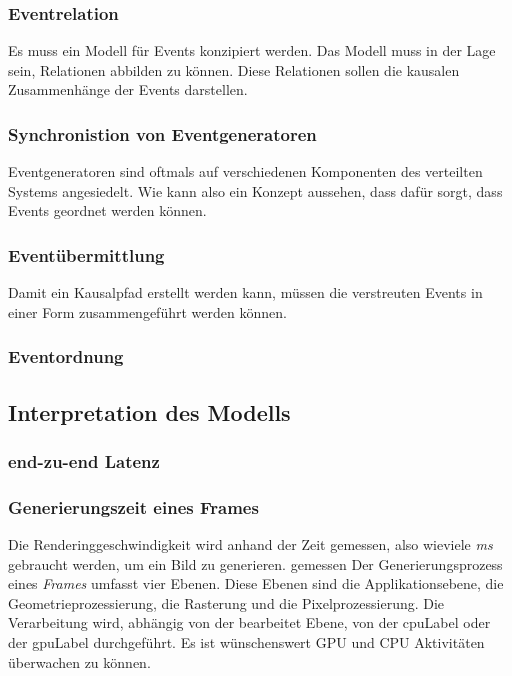\subsubsection{Eventrelation}
\label{subsection:Eventkorrelation}
Es muss ein Modell für Events konzipiert werden. Das Modell muss in der Lage sein, Relationen abbilden zu können. Diese Relationen sollen die kausalen Zusammenhänge der Events darstellen. 

\subsubsection{Synchronistion von Eventgeneratoren}
\label{subsection:Synchronistion von Eventgeneratoren}
Eventgeneratoren sind oftmals auf verschiedenen Komponenten des verteilten Systems angesiedelt. Wie kann also ein Konzept aussehen, dass dafür sorgt, dass Events geordnet werden können.

\subsubsection{Eventübermittlung}
\label{section:Eventübermittlung}
Damit ein Kausalpfad erstellt werden kann, müssen die verstreuten Events in einer Form zusammengeführt werden können.

\subsubsection{Eventordnung}

\subsection{Interpretation des Modells}

\subsubsection{end-zu-end Latenz}

\subsubsection{Generierungszeit eines Frames}
Die Renderinggeschwindigkeit wird anhand der Zeit gemessen, also wieviele \emph{ms} gebraucht werden, um ein Bild zu generieren. gemessen Der Generierungsprozess eines \emph{Frames} umfasst vier Ebenen. Diese Ebenen sind die Applikationsebene, die Geometrieprozessierung, die Rasterung und die Pixelprozessierung. Die Verarbeitung wird, abhängig von der bearbeitet Ebene, von der \gls{cpuLabel} oder der \gls{gpuLabel} durchgeführt. Es ist wünschenswert GPU und CPU Aktivitäten überwachen zu können.

